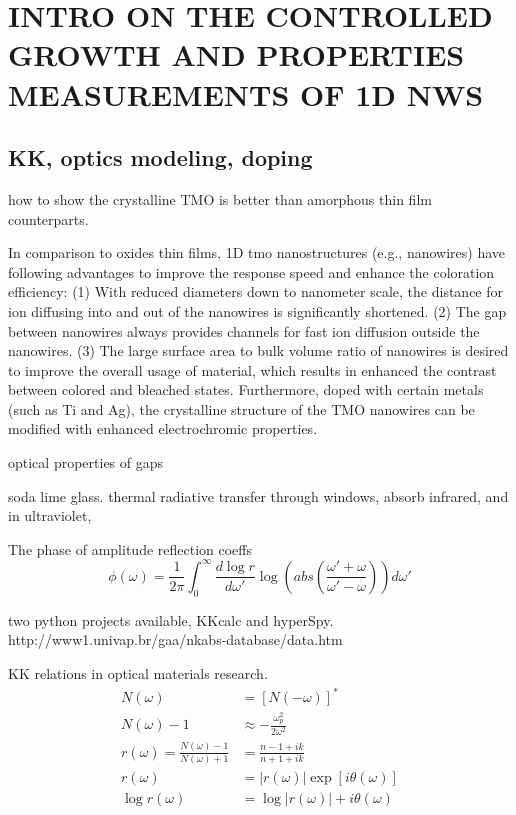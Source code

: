 
\chapter{INTRO ON THE CONTROLLED GROWTH AND PROPERTIES MEASUREMENTS OF 1D NWS}

\section{KK, optics modeling, doping}

how to show the crystalline TMO is better than amorphous thin film counterparts.

In comparison to oxides thin films, 1D \gls{tmo} nanostructures (e.g., nanowires) have following advantages to improve the response speed and enhance the coloration efficiency: (1) With reduced diameters down to nanometer scale, the distance for ion diffusing into and out of the nanowires is significantly shortened. (2) The gap between nanowires always provides channels for fast ion diffusion outside the nanowires. (3) The large surface area to bulk volume ratio of nanowires is desired to improve the overall usage of material, which results in enhanced the contrast between colored and bleached states. Furthermore, doped with certain metals (such as Ti and Ag), the crystalline structure of the TMO nanowires can be modified with enhanced electrochromic properties.\cite{Xiong2008}

optical properties of  gaps\cite{Saygin-Hinczewski2008}

soda lime glass. thermal radiative transfer through windows, \cite{Rubin1985}  absorb infrared, and  in ultraviolet,  

The phase of amplitude reflection coeffs
\[
\phi(\omega) = \frac{1}{2\pi} \int_0^\infty \frac{d\log r}{d\omega'}\log(abs(\frac{\omega' + \omega}{\omega' - \omega}))d\omega'
\]

two python projects available, KKcalc\cite{Watts2014} and hyperSpy. 
http://www1.univap.br/gaa/nkabs-database/data.htm

KK relations in optical materials research. 
\begin{align}
N(\omega) &= [N(-\omega)]^* \\
N(\omega) - 1 &\approx -\frac{\omega_p^2}{2\omega^2}\\
r(\omega) = \frac{N(\omega)-1}{N(\omega)+1} &= \frac{n-1+ik}{n+1+ik}\\
r(\omega) &= |r(\omega)| \exp[i\theta(\omega)]\\
\log r(\omega) &= \log|r(\omega)| + i\theta(\omega)
\end{align}

